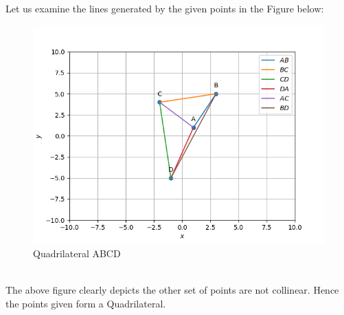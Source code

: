 \documentclass[journal,12pt,twocolumn]{IEEEtran}
\begin{document}
Let us examine the lines generated by the given points in the Figure below:
\begin{figure}[!ht]
    \centering
    \includegraphics[width=\linewidth]{QUAD.png}
    \caption{Quadrilateral ABCD}
    \label{fig:Quad ABCD}
\end{figure}
\\
The above figure clearly depicts the other set of points are not collinear. Hence the points given form a Quadrilateral.
\\
\end{document}
